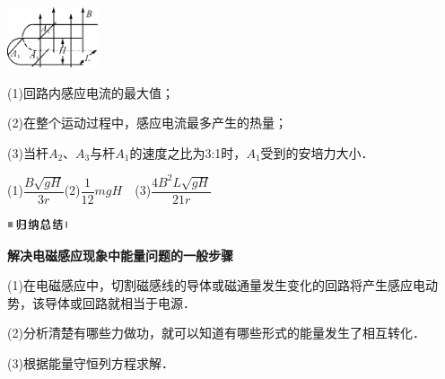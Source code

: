 \begin{center}\includegraphics[width=1.04722in,height=0.69792in]{media/image431.png}\end{center}

(1)回路内感应电流的最大值；

(2)在整个运动过程中，感应电流最多产生的热量；

(3)当杆$A_2$、$A_3$与杆$A_1$的速度之比为3:1时，$A_1$受到的安培力大小．
\begin{solution}
	(1)$\dfrac{B \sqrt{g H}}{3 r}$(2)$\dfrac{1}{12} m g H$　(3)$\dfrac{4 B^{2} L \sqrt{g H}}{21 r}$
\end{solution}

\begin{center}\includegraphics[width=0.70764in,height=0.12292in]{media/image13.png}\end{center}
\begin{center}
	\textbf{解决电磁感应现象中能量问题的一般步骤}
\end{center}

(1)在电磁感应中，切割磁感线的导体或磁通量发生变化的回路将产生感应电动势，该导体或回路就相当于电源．

(2)分析清楚有哪些力做功，就可以知道有哪些形式的能量发生了相互转化．

(3)根据能量守恒列方程求解．

